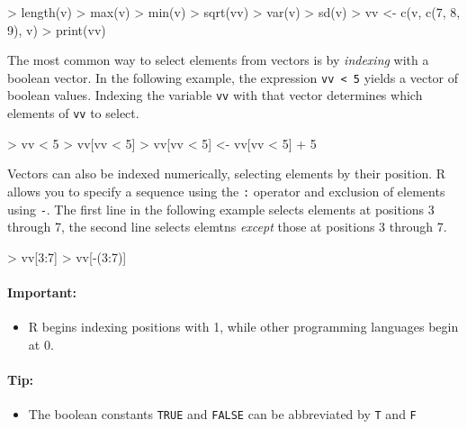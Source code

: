 \begin{samepage}
\begin{Rcode}
> length(v)
> max(v)
> min(v)
> sqrt(vv)
> var(v)
> sd(v)
> vv <- c(v, c(7, 8, 9), v)
> print(vv)
\end{Rcode}
\end{samepage}

The most common way to select elements from vectors is by \emph{indexing} with a boolean vector. In the following example, the expression \texttt{vv < 5} yields a vector of boolean values. Indexing the variable \texttt{vv} with that vector determines which elements of \texttt{vv} to select.

\begin{samepage}
\begin{Rcode}
> vv < 5
> vv[vv < 5]
> vv[vv < 5] <- vv[vv < 5] + 5
\end{Rcode}
\end{samepage}

Vectors can also be indexed numerically, selecting elements by their position. R allows you to specify a sequence using the \texttt{:} operator and exclusion of elements using \texttt{-}. The first line in the following example selects elements at positions 3 through 7, the second line selects elemtns \emph{except} those at positions 3 through 7.

\begin{samepage}
\begin{Rcode}
> vv[3:7]
> vv[-(3:7)]
\end{Rcode}
\end{samepage}

\begin{tcolorbox}[colback=alert]
\paragraph*{Important:}
\begin{itemize}
   \item R begins indexing positions with 1, while other programming languages begin at 0.
\end{itemize}
\end{tcolorbox}

\begin{tcolorbox}[colback=code]
\paragraph*{Tip:}
\begin{itemize}
   \item The boolean constants \texttt{TRUE} and \texttt{FALSE} can be abbreviated by \texttt{T} and \texttt{F}
\end{itemize}
\end{tcolorbox}

